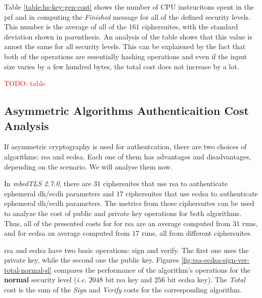 \documentclass{llncs}
\newcommand{\todo}[1]{\textcolor{red}{TODO: #1}\PackageWarning{TODO:}{#1!}}
\begin{document}
Table \ref{table:hs-key-gen-cost} shows the number of CPU instrucitons spent in the \gls{prf}
and in computing the \textit{Finished} message for all of the defined security levels. 
This number is the average of all of the $161$ ciphersuites, with the standard deviation shown in parenthesis.
An analysis of the table shows that this value is amost the same for all security levels. This can be explaiened by
the fact that both of the operations are essentially hashing operations and even if the input size varies
by a few hundred bytes, the total cost does not increase by a lot.

\todo{table}

\subsection{Asymmetric Algorithms Authenticaition Cost Analysis} 

If asymmetric cryptography is used for authentcation, there are two
choices of algorithms: \gls{rsa} and \gls{ecdsa}. Each one of them has advantages and disadvantages, depending on the
scenario. We will analyse them now.

In \textit{mbedTLS 2.7.0}, there are $31$ ciphersuites that use \gls{rsa} to authenticate ephemeral \gls{dh}/\gls{ecdh} parameters 
and $17$ ciphersuites that use \gls{ecdsa} to authenticate ephemeral \gls{dh}/\gls{ecdh} parameters. The metrics from those
ciphersuites can be used to analyze the cost of public and private key operations for both algorithms. Thus, all of the presented
costs for for \gls{rsa} are an average computed from $31$ runs, and for \gls{ecdsa} an average computed from $17$ runs, all from
different ciphersuites.

\gls{rsa} and \gls{ecdsa} have two basic operations: sign and verify. The first one uses the private key, while the
second one the public key. Figures \ref{fig:rsa-ecdsa-sign-ver-total-normal-sl} compares the performance of the algorithm's
operations for the \textbf{normal} security level (\textit{i.e.} $2048$ bit \gls{rsa} key and $256$ bit \gls{ecdsa} key).
The \textit{Total} cost is the sum of the \textit{Sign} and \textit{Verify} costs for the corresponding algorithm.
\end{document}
